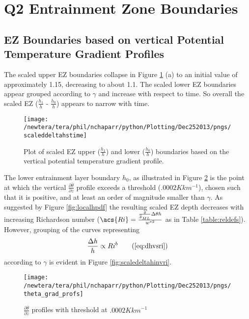 \section{Q2 Entrainment Zone Boundaries}
\label{sec:deltahri}
\FloatBarrier
\subsection{\acs{EZ} Boundaries based on vertical Potential Temperature Gradient Profiles}
The scaled upper \acs{EZ} boundaries collapse in Figure \ref{fig:scaledEZlims} (a) to an initial value of approximately 1.15, decreasing to about 1.1.  The scaled lower \acs{EZ} boundaries appear grouped according to $\gamma$ and increase with respect to time.  So overall the scaled \acs{EZ} ($\frac{h_{1}}{h}$ - $\frac{h_{0}}{h}$) appears to narrow with time.\\

\begin{figure}[htbp]
    \centering
    \texttt{[image: /newtera/tera/phil/nchaparr/python/Plotting/Dec252013/pngs/scaleddeltahstime]}
    \caption{Plot of scaled \acs{EZ} upper ($\frac{h_{1}}{h}$) and lower ($\frac{h_{0}}{h}$) boundaries based on the vertical potential temperature gradient profile.}
    \label{fig:scaledEZlims}   %
\end{figure}

The lower entrainment layer boundary $h_{0}$, as illustrated in Figure \ref{fig:thresh} is the point at which the vertical 
$\frac{\partial \overline{\theta}}{\partial z}$ profile exceeds a threshold ($.0002K km^{-1}$), chosen such that
it is positive, and at least an order of magnitude smaller than $\gamma$.   
As suggested by Figure \ref{fig:localhpdf} the resulting scaled \acs{EZ} depth decreases with increasing Richardson number ($\acs{Ri} = \frac{\frac{g}{\overline{\theta}_{ML}}\Delta \theta h}{w^{*2}}$ as in Table \ref{table:reldefs}).  However, grouping of the curves representing
\begin{equation}
\frac{\Delta h}{h} \propto Ri ^{b} \tag{\ref{eq:dhvsri}}
\end{equation}
according to $\gamma$ is evident in Figure \ref{fig:scaledeltahinvri}.\\


\begin{figure}[htbp]
    \centering
    \texttt{[image: /newtera/tera/phil/nchaparr/python/Plotting/Dec252013/pngs/theta\_grad\_profs]}
    \caption{$\frac{\partial \overline{\theta}}{\partial z}$ profiles with threshold at $.0002Kkm^{-1}$}
    \label{fig:thresh}   %
\end{figure}

